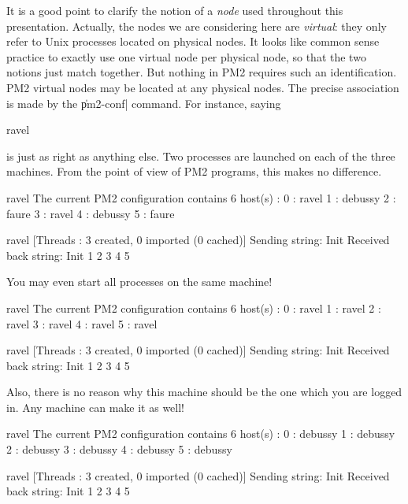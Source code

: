 It is a good point to clarify the notion of a \emph{node} used
throughout this presentation. Actually, the nodes we are considering
here are \emph{virtual}: they only refer to Unix processes located on
physical nodes. It looks like common sense practice to exactly use one
virtual node per physical node, so that the two notions just match
together. But nothing in PM2 requires such an identification. PM2
virtual nodes may be located at any physical nodes. The precise
association is made by the \|pm2-conf| command. For instance, saying
\begin{shell}
ravel%
\end{shell}
is just as right as anything else. Two processes are launched on each
of the three machines. From the point of view of PM2 programs, this
makes no difference.
\begin{shell}
ravel%
The current PM2 configuration contains 6 host(s) :
0 : ravel
1 : debussy
2 : faure
3 : ravel
4 : debussy
5 : faure

ravel%
[Threads : 3 created, 0 imported (0 cached)]
Sending string: Init
Received back string: Init 1 2 3 4 5
\end{shell}
You may even start all processes on the same machine!
\begin{shell}
ravel%
The current PM2 configuration contains 6 host(s) :
0 : ravel
1 : ravel
2 : ravel
3 : ravel
4 : ravel
5 : ravel

ravel%
[Threads : 3 created, 0 imported (0 cached)]
Sending string: Init
Received back string: Init 1 2 3 4 5
\end{shell}
Also, there is no reason why this machine should be the one which you
are logged in. Any machine can make it as well!
\begin{shell}
ravel%
The current PM2 configuration contains 6 host(s) :
0 : debussy
1 : debussy
2 : debussy
3 : debussy
4 : debussy
5 : debussy

ravel%
[Threads : 3 created, 0 imported (0 cached)]
Sending string: Init
Received back string: Init 1 2 3 4 5
\end{shell}
